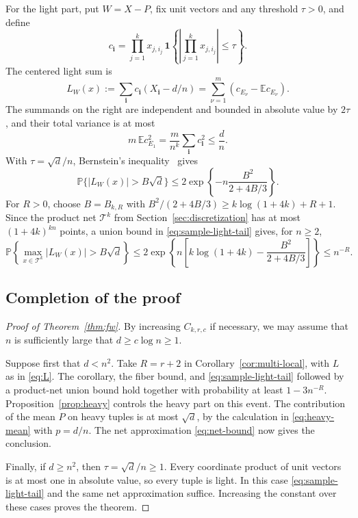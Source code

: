 \documentclass[10pt,a4paper]{amsart}
\numberwithin{equation}{section}
\newcommand{\E}{\mathbb E}
\newcommand{\Pp}{\mathbb P}
\newcommand{\one}{\mathbf 1}
\begin{document}
For the light part, put $W=X-P$, fix unit vectors and any threshold
$\tau>0$, and define
\[
 c_{\mathbf i}=\prod_{j=1}^k x_{j,i_j}\,
                   \one\left\{\left|\prod_{j=1}^k x_{j,i_j}\right|
                                    \le\tau\right\}.
\]
The centered light sum is
\begin{equation}\label{eq:sample-light}
 L_W(x):=\sum_{\mathbf i}c_{\mathbf i}(X_{\mathbf i}-d/n)
 =\sum_{\nu=1}^m\left(c_{E_\nu}-\E c_{E_\nu}\right).
\end{equation}
The summands on the right are independent and bounded in absolute value by
$2\tau$, and their total variance is at most
\begin{equation}\label{eq:sample-variance}
 m\,\E c_{E_1}^2
 =\frac{m}{n^k}\sum_{\mathbf i}c_{\mathbf i}^2
 \le\frac dn.
\end{equation}
With $\tau=\sqrt d/n$, Bernstein's inequality~\cite[Theorem~2.9.5]{V26}
gives
\begin{equation}\label{eq:sample-light-tail}
 \Pp\{|L_W(x)|>B\sqrt d\}
 \le2\exp\left\{-n\frac{B^2}{2+4B/3}\right\}.
\end{equation}
For $R>0$, choose $B=B_{k,R}$ with
$B^2/(2+4B/3)\ge k\log(1+4k)+R+1$.
Since the product net $\mathcal T^k$ from Section~\ref{sec:discretization}
has at most $(1+4k)^{kn}$ points, a union bound in
\eqref{eq:sample-light-tail} gives, for $n\ge2$,
\[
 \Pp\left\{\max_{x\in\mathcal T^k}|L_W(x)|>B\sqrt d\right\}
 \le2\exp\left\{n\left[k\log(1+4k)-\frac{B^2}{2+4B/3}\right]\right\}
 \le n^{-R}.
\]

\subsection{Completion of the proof}

\begin{proof}[Proof of Theorem~\ref{thm:fw}]
By increasing $C_{k,r,c}$ if necessary, we may assume that $n$
is sufficiently large that $d\ge c\log n\ge1$.

Suppose first that $d<n^2$.
Take $R=r+2$ in
Corollary~\ref{cor:multi-local}, with $L$ as in \eqref{eq:L}.
The corollary, the fiber bound, and
\eqref{eq:sample-light-tail} followed by a product-net union bound
hold together with probability at least $1-3n^{-R}$.
Proposition~\ref{prop:heavy} controls the heavy part on this event.
The contribution of the mean $P$ on heavy tuples is at most
$\sqrt d$, by the calculation in \eqref{eq:heavy-mean} with $p=d/n$.
The net approximation \eqref{eq:net-bound} now gives the conclusion.

Finally, if $d\ge n^2$, then $\tau=\sqrt d/n\ge1$.
Every coordinate product of unit vectors is at most one in absolute
value, so every tuple is light. In this case
\eqref{eq:sample-light-tail} and the same net approximation suffice.
Increasing the constant over these cases proves the theorem.
\end{proof}
\end{document}
